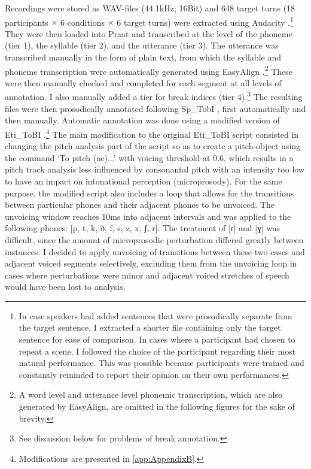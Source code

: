 Recordings were stored as WAV-files (44.1kHz; 16Bit) and 648 target turns (18 participants $\times$ 6 conditions $\times$ 6 target turns) were extracted using Audacity \citep{AudacityTeam}.\footnote{In case speakers had added sentences that were prosodically separate from the target sentence, I extracted a shorter file containing only the target sentence for ease of comparison. In cases where a participant had chosen to repeat a scene, I followed the choice of the participant regarding their most natural performance. This was possible because participants were trained and constantly reminded to report their opinion on their own performances.} They were then loaded into Praat \citep{BoersmaWeenink.praat} and transcribed at the level of the phoneme (tier 1), the syllable (tier 2), and the utterance (tier 3). The utterance was transcribed manually in the form of plain text, from which the syllable and phoneme transcription were automatically generated using EasyAlign \citep{Goldman.2011}.\footnote{A word level and utterance level phonemic transcription, which are also generated by EasyAlign, are omitted in the following figures for the sake of brevity.} These were then manually checked and completed for each segment at all levels of annotation. I also manually added a tier for break indices (tier 4).\footnote{See discussion below for problems of break annotation.} The resulting files were then prosodically annotated following Sp\_TobI \citep{BeckmanETAL.2002,EstebasVilaplanaPrieto.2008,HualdePrieto2015}, first automatically and then manually. Automatic annotation was done using a modified version of Eti\_ToBI \citep{ElviraGarciaRoseanoFernandezPlanas.2016}.\footnote{Modifications are presented in \autoref{app:AppendixB}.} The main modification to the original Eti\_ToBI script consisted in changing the pitch analysis part of the script so as to create a pitch-object using the command `To pitch (ac)...' with voicing threshold at 0.6, which results in a pitch track analysis less influenced by consonantal pitch with an intensity too low to have an impact on intonational perception (microprosody). For the same purpose, the modified script also includes a loop that allows for the transitions between particular phones and their adjacent phones to be unvoiced. The unvoicing window reaches 10ms into adjacent intervals and was applied to the following phones: [p, t, k, ð, f, s, z, x, ʃ, r]. The treatment of [ɾ] and [ɣ] was difficult, since the amount of microprosodic perturbation differed greatly between instances. I decided to apply unvoicing of transitions between these two cases and adjacent voiced segments selectively, excluding them from the unvoicing loop in cases where perturbations were minor and adjacent voiced stretches of speech would have been lost to analysis. 

